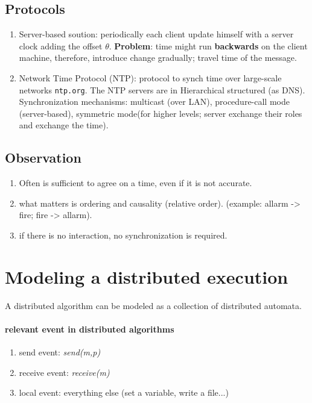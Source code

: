 \documentclass[11pt]{article}
\begin{document}
\subsection{Protocols} %
\label{ssub:protocols}
\begin{enumerate}
	\item Server-based soution: periodically each client update himself with a server clock adding the offset $\theta$. \textbf{Problem}: time might run \textbf{backwards} on the client machine, therefore, introduce change gradually; travel time of the message.

	\item Network Time Protocol (NTP): protocol to synch time over large-scale networks \texttt{ntp.org}. The NTP servers are in Hierarchical structured (as DNS). Synchronization mechanisms: multicast (over LAN), procedure-call mode (server-based), symmetric mode(for higher levels; server exchange their roles and exchange the time).
\end{enumerate}

\subsection{Observation} %
\label{sub:observation}
\begin{enumerate}
	\item Often is sufficient to agree on a time, even if it is not accurate.
	\item what matters is ordering and causality (relative order). (example: allarm -> fire; fire -> allarm).
	\item if there is no interaction, no synchronization is required.
\end{enumerate}


\section{Modeling a distributed execution} %
\label{sec:modeling_a_distributed_execution}
A distributed algorithm can be modeled as a collection of distributed automata.
\paragraph{relevant event in distributed algorithms} %
\label{par:relevant_event_in_distributed_algorithms}
\begin{enumerate}
	\item send event: \textit{send(m,p)}
	\item receive event: \textit{receive(m)}
	\item local event: everything else (set a variable, write a file...)
\end{enumerate}
\end{document}

